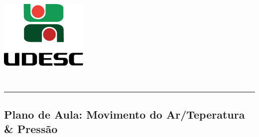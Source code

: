 \thispagestyle{empty}
\begin{center}
	\begin{minipage}[!]{\linewidth}
		\begin{minipage}[!]{.19\linewidth}
			\includegraphics[width=\linewidth]{assets/logo.png}
		\end{minipage}
		\begin{minipage}[!]{.8\linewidth}
			\center
			\ABNTEXchapterfont\normalsize\MakeUppercase{\imprimirinstituicao}
			\par
			\vspace*{10pt}                     
			\ABNTEXchapterfont\normalsize\MakeUppercase{\centro}
			\par
			\vspace*{10pt}           
			\ABNTEXchapterfont\normalsize\MakeUppercase{\disciplina}
		\end{minipage}        
	\end{minipage}
	\\ \vspace{0.5cm}
	\rule{\textwidth}{.5pt}   
\end{center}
\textual
\begin{center}
	\section{Plano de Aula: Movimento do Ar/Teperatura \& Pressão} %
	\label{sec:Plano de Aula: Movimento do Ar/Teperatura/Pressão}
\end{center}

